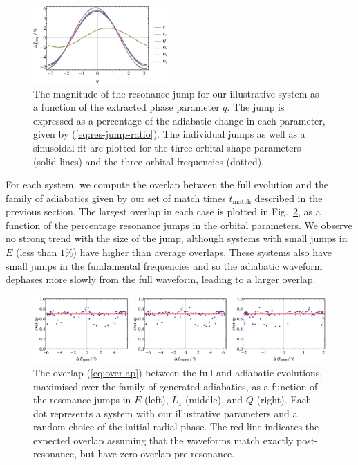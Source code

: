 \documentclass[aps,prd,amsfonts,amssymb,amsmath,nofootinbib,showpacs,superscriptaddress,twocolumn]{revtex4}
\newcommand{\eqnref}[1]{(\ref{eq:#1})}
\newcommand{\figref}[1]{Fig.\ \ref{fig:#1}}
\begin{document}
\begin{figure}[htbp]
\centering
\includegraphics[width=0.46\textwidth]{Fig_jump_vs_q}
\caption{\label{fig:resjump-vs-q}The magnitude of the resonance jump for our illustrative system as a function of the extracted phase parameter $q$. The jump is expressed as a percentage of the adiabatic change in each parameter, given by \eqnref{res-jump-ratio}. The individual jumps as well as a sinusoidal fit are plotted for the three orbital shape parameters (solid lines) and the three orbital frequencies (dotted).}
\end{figure}

For each system, we compute the overlap between the full evolution and the family of adiabatics given by our set of match times $t_\mathrm{match}$ described in the previous section. The largest overlap in each case is plotted in \figref{overlap-vs-resjump-ill}, as a function of the percentage resonance jumps in the orbital parameters. We observe no strong trend with the size of the jump, although systems with small jumps in $E$ (less than $1\%$) have higher than average overlaps. These systems also have small jumps in the fundamental frequencies and so the adiabatic waveform dephases more slowly from the full waveform, leading to a larger overlap.

\begin{figure}[htbp]
\centering
\includegraphics[width=\textwidth]{Fig_overlap_vs_resjump_ill}
\caption{\label{fig:overlap-vs-resjump-ill}The overlap \eqnref{overlap} between the full and adiabatic evolutions, maximised over the family of generated adiabatics, as a function of the resonance jumps in $E$ (left), $L_z$ (middle), and $Q$ (right). Each dot represents a system with our illustrative parameters and a random choice of the initial radial phase. The red line indicates the expected overlap assuming that the waveforms match exactly post-resonance, but have zero overlap pre-resonance.}
\end{figure}
\end{document}
